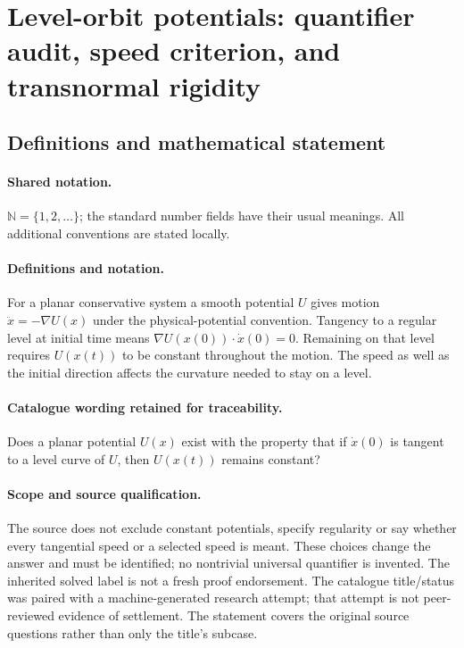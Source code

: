 \documentclass[11pt]{article}
\begin{document}
\section{Level-orbit potentials: quantifier audit, speed criterion, and transnormal rigidity}\label{statement}

\subsection{Definitions and mathematical statement}

\paragraph{Shared notation.}$\mathbb N=\{1,2,\ldots\}$; the standard number fields have their usual meanings. All additional conventions are stated locally.


\paragraph{Definitions and notation.}For a planar conservative system a smooth potential $U$ gives motion $\ddot x=-\nabla U(x)$ under the physical-potential convention. Tangency to a regular level at initial time means $\nabla U(x(0))\cdot\dot x(0)=0$. Remaining on that level requires $U(x(t))$ to be constant throughout the motion. The speed as well as the initial direction affects the curvature needed to stay on a level.

\paragraph{Catalogue wording retained for traceability.}
Does a planar potential $U(x)$ exist with the property that if $\dot x(0)$ is tangent to a level curve of $U$, then $U(x(t))$ remains constant?
\paragraph{Scope and source qualification.}The source does not exclude constant potentials, specify regularity or say whether every tangential speed or a selected speed is meant. These choices change the answer and must be identified; no nontrivial universal quantifier is invented. The inherited solved label is not a fresh proof endorsement. The catalogue title/status was paired with a machine-generated research attempt; that attempt is not peer-reviewed evidence of settlement. The statement covers the original source questions rather than only the title’s subcase.
\end{document}
